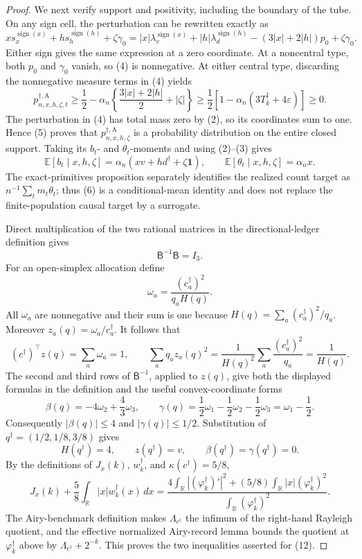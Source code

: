 \documentclass{article}
\begin{document}
{\begin{proof}
We next verify support and positivity, including the boundary of the tube.  On any
sign cell, the perturbation can be rewritten exactly as
\[
 x s_x^{\operatorname{sign}(x)}
 +h s_h^{\operatorname{sign}(h)}+\zeta\gamma_0
 =|x|\lambda_v^{\operatorname{sign}(x)}
  +|h|\lambda_d^{\operatorname{sign}(h)}
  -(3|x|+2|h|)p_0+\zeta\gamma_0.
\tag{4}
\]
Either sign gives the same expression at a zero coordinate.  At a noncentral
type, both \(p_0\) and \(\gamma_0\) vanish, so (4) is nonnegative.  At either
central type, discarding the nonnegative measure terms in (4) yields
\[
 p_{n,x,h,\zeta,t}^{\dagger,\mathrm A}
 \ge \frac12-\alpha_n\left\{
 \frac{3|x|+2|h|}{2}+|\zeta|\right\}
 \ge \frac12\left[1-\alpha_n(3T_k^\dagger+4\varepsilon)\right]\ge0.
\tag{5}
\]
The perturbation in (4) has total mass zero by (2), so its coordinates sum to
one.  Hence (5) proves that \(p_{n,x,h,\zeta}^{\dagger,\mathrm A}\) is a
probability distribution on the entire closed support.  Taking its \(b_t\)- and
\(\theta_t\)-moments and using (2)--(3) gives
\[
 \mathbb E[b_t\mid x,h,\zeta]
 =\alpha_n(xv+hd^\dagger+\zeta\mathbf1),
 \qquad
 \mathbb E[\theta_t\mid x,h,\zeta]=\alpha_nx.
\tag{6}
\]
The exact-primitives proposition separately identifies the realized count target as
\(n^{-1}\sum_tm_t\theta_t\); thus (6) is a conditional-mean identity and does not
replace the finite-population causal target by a surrogate.

Direct multiplication of the two rational matrices in the directional-ledger
definition gives
\[
 \mathsf B^{-1}\mathsf B=I_3.
\tag{7}
\]
For an open-simplex allocation define
\[
 \omega_a=\frac{(c_a^\dagger)^2}{q_aH(q)}.
\tag{8}
\]
All \(\omega_a\) are nonnegative and their sum is one because
\(H(q)=\sum_a(c_a^\dagger)^2/q_a\).  Moreover
\(z_a(q)=\omega_a/c_a^\dagger\).  It follows that
\[
 (c^\dagger)^\top z(q)=\sum_a\omega_a=1,
 \qquad
 \sum_aq_az_a(q)^2
 =\frac{1}{H(q)^2}\sum_a\frac{(c_a^\dagger)^2}{q_a}
 =\frac1{H(q)}.
\tag{9}
\]
The second and third rows of \(\mathsf B^{-1}\), applied to \(z(q)\), give both
the displayed formulas in the definition and the useful convex-coordinate forms
\[
 \beta(q)=-4\omega_2+\frac43\omega_3,
 \qquad
 \gamma(q)=\frac12\omega_1-\frac12\omega_2-\frac12\omega_3
 =\omega_1-\frac12.
\tag{10}
\]
Consequently \(|\beta(q)|\le4\) and \(|\gamma(q)|\le1/2\).  Substitution of
\(q^\dagger=(1/2,1/8,3/8)\) gives
\[
 H(q^\dagger)=4,
 \qquad z(q^\dagger)=v,
 \qquad \beta(q^\dagger)=\gamma(q^\dagger)=0.
\tag{11}
\]
By the definitions of \(J_x(k)\), \(w_k^\dagger\), and
\(\kappa(c^\dagger)=5/8\),
\[
 J_x(k)+\frac58\int_{\mathbb R}|x|w_k^\dagger(x)\,dx
 =\frac{4\int_{\mathbb R}|(\varphi_k^\dagger)'|^2
 +(5/8)\int_{\mathbb R}|x|(\varphi_k^\dagger)^2}
 {\int_{\mathbb R}(\varphi_k^\dagger)^2}.
\tag{12}
\]
The Airy-benchmark definition makes \(\Lambda_{c^\dagger}\) the infimum of the
right-hand Rayleigh quotient, and the effective normalized Airy-record lemma bounds
the quotient at \(\varphi_k^\dagger\) above by
\(\Lambda_{c^\dagger}+2^{-k}\).  This proves the two inequalities asserted for
(12).


\end{proof}}
\end{document}
